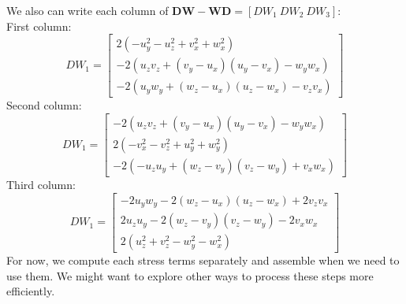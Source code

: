 We also can write each column of ${\bm{DW}} - {\bm{WD}} = \left[ DW_1 \ DW_2 \ DW_3  \right]$:
\\
First column:
\[
DW_1 = 
\begin{bmatrix}
    2 \left(- u_{y}^2-u_{z}^2  + v_{x}^2 + w_{x}^2\right)
    \\
    -2 \left(u_{z} v_{z}+\left(v_{y}-u_{x}\right) \left(u_{y}-v_{x}\right)-w_{y} w_{x}\right)
    \\
    -2 
    \left(
    u_{y} w_{y}+ \left(w_{z}-u_{x}\right) \left(u_{z}-w_{x}\right)- v_{z} v_{x}
    \right)
\end{bmatrix}
\]
Second column:
\[
DW_1 = 
\begin{bmatrix}
    -2 \left(u_{z} v_{z}+\left(v_{y}-u_{x}\right) \left(u_{y}-v_{x}\right)-w_{y} w_{x}\right)
    \\
    2 \left(- v_{x}^2 - v_{z}^2 +u_{y}^2 + w_{y}^2\right)
    \\
    -2 
    \left(
    -u_{z} u_{y}+ \left(w_{z}-v_{y}\right) \left(v_{z}-w_{y}\right)+ v_{x} w_{x}
    \right)
\end{bmatrix}
\]
Third column:
\[
DW_1 = 
\begin{bmatrix}
   -2 u_{y} w_{y}-2 \left(w_{z}-u_{x}\right) \left(u_{z}-w_{x}\right)+2 v_{z} v_{x}
   \\
   2 u_{z} u_{y}-2 \left(w_{z}-v_{y}\right) \left(v_{z}-w_{y}\right)-2 v_{x} w_{x}
   \\
   2 \left(u_{z}^2+v_{z}^2-w_{y}^2-w_{x}^2\right)
\end{bmatrix}
\]
For now, we compute each stress terms separately and assemble when we need to use them. We might want to explore other ways to process these steps more efficiently. 
